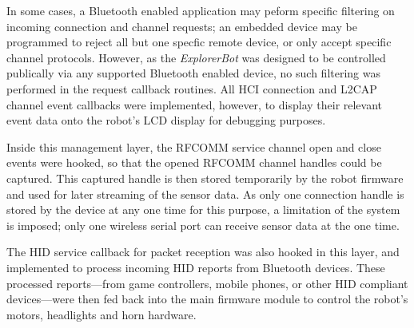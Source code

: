 

In some cases, a Bluetooth enabled application may peform specific filtering on incoming connection and channel requests; an embedded device may be programmed to reject all but one specfic remote device, or only accept specific channel protocols. However, as the \textit{ExplorerBot} was designed to be controlled publically via any supported Bluetooth enabled device, no such filtering was performed in the request callback routines. All HCI connection and L2CAP channel event callbacks were implemented, however, to display their relevant event data onto the robot's LCD display for debugging purposes.

Inside this management layer, the RFCOMM service channel open and close events were hooked, so that the opened RFCOMM channel handles could be captured. This captured handle is then stored temporarily by the robot firmware and used for later streaming of the sensor data. As only one connection handle is stored by the device at any one time for this purpose, a limitation of the system is imposed; only one wireless serial port can receive sensor data at the one time.

The HID service callback for packet reception was also hooked in this layer, and implemented to process incoming HID reports from Bluetooth devices. These processed reports---from game controllers, mobile phones, or other HID compliant devices---were then fed back into the main firmware module to control the robot's motors, headlights and horn hardware.